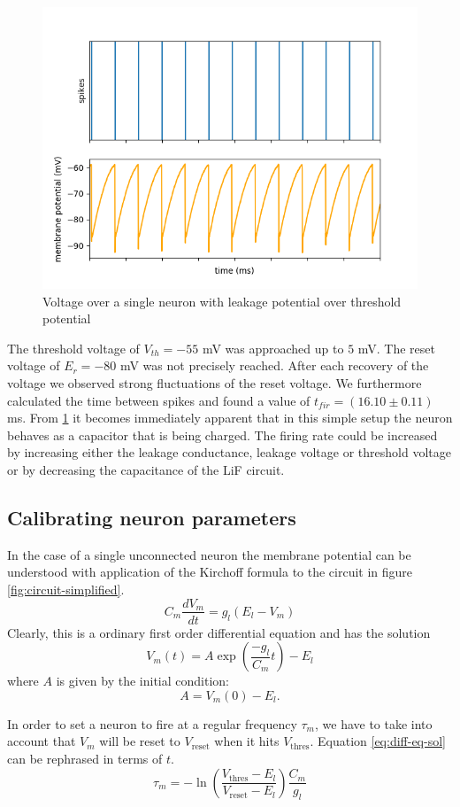 \documentclass[a4paper,twocolumn]{article}
\begin{document}
\begin{figure}[ht]
    \centering
    \includegraphics[width=.5\textwidth]{figures/fp_task1_1membrane.png}
    \caption{Voltage over a single neuron with leakage potential over threshold potential}
    \label{fig:membranes_ex1}
\end{figure}

The threshold voltage of $V_{th} = -55$ mV was approached up to $5$ mV.  The
reset voltage of $E_r = -80$ mV was not precisely reached.  After each recovery
of the voltage we observed strong fluctuations of the reset voltage.  We
furthermore calculated the time between spikes and found a value of
$t_{fir} = (16.10\pm 0.11)$ ms.  From \ref{fig:membranes_ex1} it becomes immediately 
apparent that in this simple setup the neuron behaves as a capacitor that is 
being charged.  The firing rate could be increased by increasing either the 
leakage conductance,  leakage voltage or threshold voltage or by decreasing 
the capacitance of the LiF circuit.
\subsection{Calibrating neuron parameters}

In the case of a single unconnected neuron the membrane potential can be
understood with application of the Kirchoff formula to the circuit in figure
\ref{fig:circuit-simplified}.
\[
    C_m \frac{dV_m}{dt} = g_l(E_l - V_m)
\]
Clearly, this is a ordinary first order differential equation and has the
solution
\begin{equation}
    V_m(t) = A \exp(\frac{-g_l}{C_m}t) - E_l
    \label{eq:diff-eq-sol}
\end{equation}
where $A$ is given by the initial condition:
\[
    A = V_m(0) - E_l.
\]

In order to set a neuron to fire at a regular frequency $\tau_m$, we have to take
into account that $V_m$ will be reset to $V_\text{reset}$ when it hits
$V_\text{thres}$. Equation \eqref{eq:diff-eq-sol} can be rephrased in terms of
$t$.
\[
    \tau_m = -\ln(\frac{V_\text{thres} - E_l}{V_\text{reset} - E_l})
    \frac{C_m}{g_l}
\]
\end{document}
